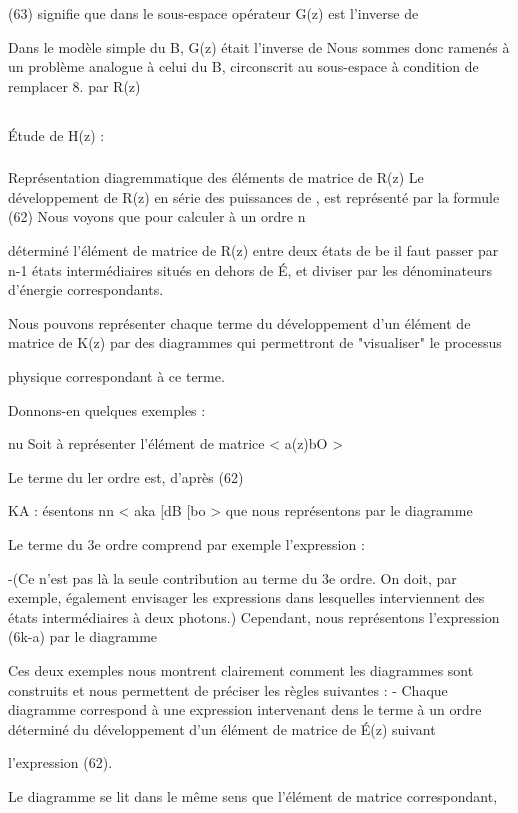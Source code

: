 (63) signifie que dans le sous-espace  opérateur G(z) est l'inverse de

Dans le modèle simple du  B, G(z) était l'inverse de
Nous sommes donc ramenés à un problème analogue à celui du  B, circonscrit
au sous-espace à condition de remplacer 8. par R(z)
\subsection{} Étude de H(z) :%
\subsubsection{} Représentation diagremmatique des éléments de matrice
de R(z)%
Le développement de R(z) en série des puissances de ,
est représenté par la formule (62) Nous voyons que pour calculer à un ordre n

déterminé l'élément de matrice de R(z) entre deux états de be il faut passer
par n-1 états intermédiaires situés en dehors de É, et diviser par les dénominateurs d'énergie correspondants.

Nous pouvons représenter chaque terme du développement d'un élément
de matrice de K(z) par des diagrammes qui permettront de "visualiser" le processus

physique correspondant à ce terme.

Donnons-en quelques exemples :

nu
Soit à représenter l'élément de matrice < a(z)bO >

Le terme du ler ordre est, d'après (62)

KA
: ésentons nn
< aka [dB [bo > que nous représentons par le diagramme

Le terme du 3e ordre comprend par exemple l'expression :

-(Ce n'est pas là la seule contribution au terme du 3e ordre.
On doit, par exemple, également envisager les expressions dans lesquelles
interviennent des états intermédiaires à deux photons.)
Cependant, nous représentons l'expression (6k-a) par le diagramme

Ces deux exemples nous montrent clairement comment les diagrammes sont construits et nous permettent de préciser les règles suivantes :
- Chaque diagramme correspond à une expression intervenant dens le terme à un
ordre déterminé du développement d'un élément de matrice de É(z) suivant

l'expression (62).

Le diagramme se lit dans le même sens que l'élément de matrice correspondant,

